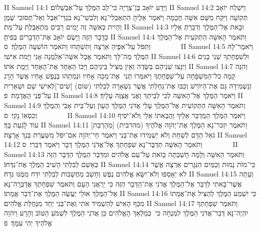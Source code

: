 II Samuel 14:1	וַיֵּדַע יוֹאָב בֶּן־צְרֻיָה כִּי־לֵב הַמֶּלֶךְ עַל־אַבְשָׁלוֹם׃
II Samuel 14:2	וַיִּשְׁלַח יוֹאָב תְּקוֹעָה וַיִּקַּח מִשָּׁם אִשָּׁה חֲכָמָה וַיֹּאמֶר אֵלֶיהָ הִתְאַבְּלִי־נָא וְלִבְשִׁי־נָא בִגְדֵי־אֵבֶל וְאַל־תָּסוּכִי שֶׁמֶן וְהָיִית כְּאִשָּׁה זֶה יָמִים רַבִּים מִתְאַבֶּלֶת עַל־מֵת׃
II Samuel 14:3	וּבָאת אֶל־הַמֶּלֶךְ וְדִבַּרְתְּ אֵלָיו כַּדָּבָר הַזֶּה וַיָּשֶׂם יוֹאָב אֶת־הַדְּבָרִים בְּפִיהָ׃
II Samuel 14:4	וַתֹּאמֶר הָאִשָּׁה הַתְּקֹעִית אֶל־הַמֶּלֶךְ וַתִּפֹּל עַל־אַפֶּיהָ אַרְצָה וַתִּשְׁתָּחוּ וַתֹּאמֶר הוֹשִׁעָה הַמֶּלֶךְ׃ {ס}        
II Samuel 14:5	וַיֹּאמֶר־לָהּ הַמֶּלֶךְ מַה־לָּךְ וַתֹּאמֶר אֲבָל אִשָּׁה־אַלְמָנָה אָנִי וַיָּמת אִישִׁי׃
II Samuel 14:6	וּלְשִׁפְחָתְךָ שְׁנֵי בָנִים וַיִּנָּצוּ שְׁנֵיהֶם בַּשָּׂדֶה וְאֵין מַצִּיל בֵּינֵיהֶם וַיַּכּוֹ הָאֶחָד אֶת־הָאֶחָד וַיָּמֶת אֹתוֹ׃
II Samuel 14:7	וְהִנֵּה קָמָה כל־הַמִּשְׁפָּחָה עַל־שִׁפְחָתֶךָ וַיֹּאמְרוּ תְּנִי  אֶת־מַכֵּה אָחִיו וּנְמִתֵהוּ בְּנֶפֶשׁ אָחִיו אֲשֶׁר הָרָג וְנַשְׁמִידָה גַּם אֶת־הַיּוֹרֵשׁ וְכִבּוּ אֶת־גַּחַלְתִּי אֲשֶׁר נִשְׁאָרָה לְבִלְתִּי (שום) [שִׂים־]לְאִישִׁי שֵׁם וּשְׁאֵרִית עַל־פְּנֵי הָאֲדָמָה׃ {פ}
II Samuel 14:8	וַיֹּאמֶר הַמֶּלֶךְ אֶל־הָאִשָּׁה לְכִי לְבֵיתֵךְ וַאֲנִי אֲצַוֶּה עָלָיִךְ׃
II Samuel 14:9	וַתֹּאמֶר הָאִשָּׁה הַתְּקוֹעִית אֶל־הַמֶּלֶךְ עָלַי אֲדֹנִי הַמֶּלֶךְ הֶעָוֺן וְעַל־בֵּית אָבִי וְהַמֶּלֶךְ וְכִסְאוֹ נָקִי׃ {ס}        
II Samuel 14:10	וַיֹּאמֶר הַמֶּלֶךְ הַמְדַבֵּר אֵלַיִךְ וַהֲבֵאתוֹ אֵלַי וְלֹא־יֹסִיף עוֹד לָגַעַת בָּךְ׃
II Samuel 14:11	וַתֹּאמֶר יִזְכּר־נָא הַמֶּלֶךְ אֶת־יְהֹוָה אֱלֹהֶיךָ (מהרבית) [מֵהַרְבַּת] גֹּאֵל הַדָּם לְשַׁחֵת וְלֹא יַשְׁמִידוּ אֶת־בְּנִי וַיֹּאמֶר חַי־יְהֹוָה אִם־יִפֹּל מִשַּׂעֲרַת בְּנֵךְ אָרְצָה׃
II Samuel 14:12	וַתֹּאמֶר הָאִשָּׁה תְּדַבֶּר־נָא שִׁפְחָתְךָ אֶל־אֲדֹנִי הַמֶּלֶךְ דָּבָר וַיֹּאמֶר דַּבֵּרִי׃ {ס}        
II Samuel 14:13	וַתֹּאמֶר הָאִשָּׁה וְלָמָּה חָשַׁבְתָּה כָּזֹאת עַל־עַם אֱלֹהִים וּמִדַּבֵּר הַמֶּלֶךְ הַדָּבָר הַזֶּה כְּאָשֵׁם לְבִלְתִּי הָשִׁיב הַמֶּלֶךְ אֶת־נִדְּחוֹ׃
II Samuel 14:14	כִּי־מוֹת נָמוּת וְכַמַּיִם הַנִּגָּרִים אַרְצָה אֲשֶׁר לֹא יֵאָסֵפוּ וְלֹא־יִשָּׂא אֱלֹהִים נֶפֶשׁ וְחָשַׁב מַחֲשָׁבוֹת לְבִלְתִּי יִדַּח מִמֶּנּוּ נִדָּח׃
II Samuel 14:15	וְעַתָּה אֲשֶׁר־בָּאתִי לְדַבֵּר אֶל־הַמֶּלֶךְ אֲדֹנִי אֶת־הַדָּבָר הַזֶּה כִּי יֵרְאֻנִי הָעָם וַתֹּאמֶר שִׁפְחָתְךָ אֲדַבְּרָה־נָּא אֶל־הַמֶּלֶךְ אוּלַי יַעֲשֶׂה הַמֶּלֶךְ אֶת־דְּבַר אֲמָתוֹ׃
II Samuel 14:16	כִּי יִשְׁמַע הַמֶּלֶךְ לְהַצִּיל אֶת־אֲמָתוֹ מִכַּף הָאִישׁ לְהַשְׁמִיד אֹתִי וְאֶת־בְּנִי יַחַד מִנַּחֲלַת אֱלֹהִים׃
II Samuel 14:17	וַתֹּאמֶר שִׁפְחָתְךָ יִהְיֶה־נָּא דְּבַר־אֲדֹנִי הַמֶּלֶךְ לִמְנֻחָה כִּי  כְּמַלְאַךְ הָאֱלֹהִים כֵּן אֲדֹנִי הַמֶּלֶךְ לִשְׁמֹעַ הַטּוֹב וְהָרָע וַיהֹוָה אֱלֹהֶיךָ יְהִי עִמָּךְ׃ {פ}
